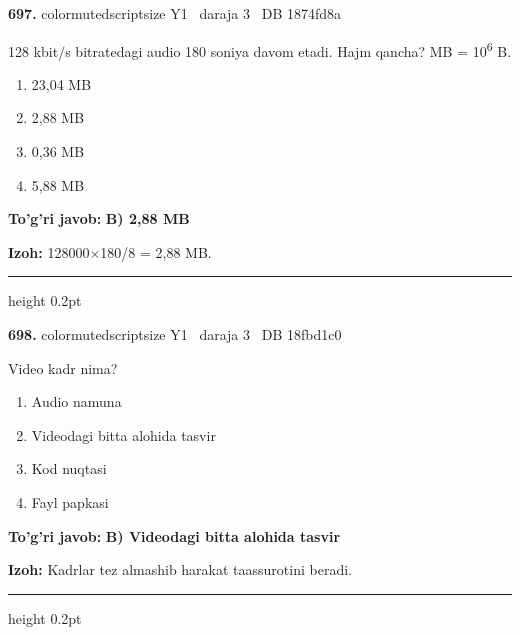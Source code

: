 \documentclass[10pt,a4paper,oneside]{article}
\begin{document}
\noindent\textbf{\color{ink}697.}  {color{muted}scriptsize Y1 \textbullet\ daraja 3 \textbullet\ DB 1874fd8a}
\par
128 kbit/s bitratedagi audio 180 soniya davom etadi. Hajm qancha? MB = 10\textsuperscript{6} B.
\begin{enumerate}[label=\Alph*),leftmargin=9mm]
\item 23,04 MB
\item 2,88 MB
\item 0,36 MB
\item 5,88 MB
\end{enumerate}
\begin{tcolorbox}[enhanced,breakable,colback=teal!4,colframe=teal!50!black,boxrule=0.5pt,arc=1.1mm,left=3mm,right=3mm,top=1.7mm,bottom=1.7mm,before skip=2mm,after skip=2mm]
\textbf{\color{teal}To'g'ri javob:} \textbf{B) 2,88 MB}
\par\smallskip
\textbf{Izoh:} 128000\ensuremath{\times}180/8 = 2,88 MB.
\end{tcolorbox}
\vspace{2mm}\hrule height 0.2pt \vspace{3mm}

\noindent\textbf{\color{ink}698.}  {color{muted}scriptsize Y1 \textbullet\ daraja 3 \textbullet\ DB 18fbd1c0}
\par
Video kadr nima?
\begin{enumerate}[label=\Alph*),leftmargin=9mm]
\item Audio namuna
\item Videodagi bitta alohida tasvir
\item Kod nuqtasi
\item Fayl papkasi
\end{enumerate}
\begin{tcolorbox}[enhanced,breakable,colback=teal!4,colframe=teal!50!black,boxrule=0.5pt,arc=1.1mm,left=3mm,right=3mm,top=1.7mm,bottom=1.7mm,before skip=2mm,after skip=2mm]
\textbf{\color{teal}To'g'ri javob:} \textbf{B) Videodagi bitta alohida tasvir}
\par\smallskip
\textbf{Izoh:} Kadrlar tez almashib harakat taassurotini beradi.
\end{tcolorbox}
\vspace{2mm}\hrule height 0.2pt \vspace{3mm}
\end{document}
